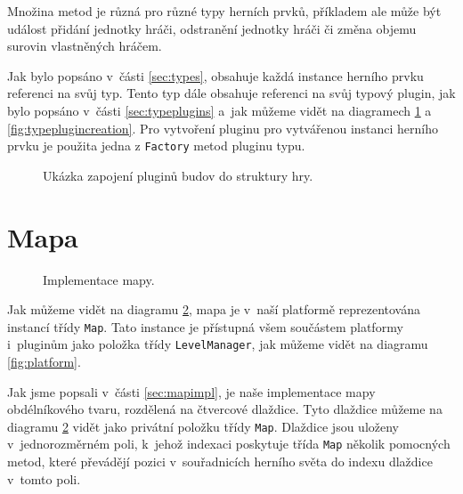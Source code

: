 Množina metod je různá pro různé typy herních prvků, příkladem ale může být událost přidání jednotky hráči, odstranění jednotky hráči či změna objemu surovin vlastněných hráčem.

Jak bylo popsáno v~části \ref{sec:types}, obsahuje každá instance herního prvku referenci na svůj typ. Tento typ dále obsahuje referenci na svůj typový plugin, jak bylo popsáno v~části \ref{sec:typeplugins} a~jak můžeme vidět na diagramech \ref{fig:pluginstructure} a \ref{fig:typeplugincreation}. Pro vytvoření pluginu pro vytvářenou instanci herního prvku je použita jedna z \texttt{Factory} metod pluginu typu. 

\begin{figure}[h]
	\centering
	\fontsize{8pt}{11pt}\selectfont
	\def\svgwidth{\textwidth}
	
	\caption{Ukázka zapojení pluginů budov do struktury hry.}
	\label{fig:pluginstructure}
\end{figure}

\section{Mapa}
\label{sec:mapimpldoc}

\begin{figure}[h]
	\centering
	\fontsize{8pt}{11pt}\selectfont
	\def\svgwidth{\textwidth}
	
	\caption{Implementace mapy.}
	\label{fig:mapimpl}
\end{figure}

Jak můžeme vidět na diagramu \ref{fig:mapimpl}, mapa je v~naší platformě reprezentována instancí třídy \texttt{Map}. Tato instance je přístupná všem součástem platformy i~pluginům jako položka třídy \texttt{LevelManager}, jak můžeme vidět na diagramu \ref{fig:platform}. 

Jak jsme popsali v~části \ref{sec:mapimpl}, je naše implementace mapy obdélníkového tvaru, rozdělená na čtvercové dlaždice. Tyto dlaždice můžeme na diagramu \ref{fig:mapimpl} vidět jako privátní položku třídy \texttt{Map}. Dlaždice jsou uloženy v~jednorozměrném poli, k~jehož indexaci poskytuje třída \texttt{Map} několik pomocných metod, které převádějí pozici v~souřadnicích herního světa do indexu dlaždice v~tomto poli. 

